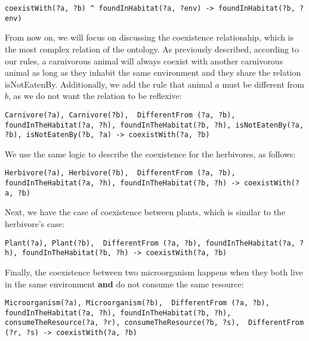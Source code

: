 \begin{lstlisting}
coexistWith(?a, ?b) ^ foundInHabitat(?a, ?env) -> foundInHabitat(?b, ?env)
\end{lstlisting}


From now on, we will focus on discussing the coexistence relationship, which is the most complex relation of the ontology. As previously described, according to our rules, a carnivorous animal will always coexist with another carnivorous animal as long as they inhabit the same environment and they share the relation isNotEatenBy. Additionally, we add the rule that animal $a$ must be different from $b$, as we do not want the relation to be reflexive:


\begin{lstlisting}
Carnivore(?a), Carnivore(?b),  DifferentFrom (?a, ?b), foundInTheHabitat(?a, ?h), foundInTheHabitat(?b, ?h), isNotEatenBy(?a, ?b), isNotEatenBy(?b, ?a) -> coexistWith(?a, ?b)
\end{lstlisting}

We use the same logic to describe the coexistence for the herbivores, as follows:
\\

\begin{lstlisting}
Herbivore(?a), Herbivore(?b),  DifferentFrom (?a, ?b), foundInTheHabitat(?a, ?h), foundInTheHabitat(?b, ?h) -> coexistWith(?a, ?b)
\end{lstlisting}

Next, we have the case of coexistence between plants, which is similar to the herbivore's case:
\\

\begin{lstlisting}
Plant(?a), Plant(?b),  DifferentFrom (?a, ?b), foundInTheHabitat(?a, ?h), foundInTheHabitat(?b, ?h) -> coexistWith(?a, ?b)
\end{lstlisting}

Finally, the coexistence between two microorganism happens when they both live in the same environment \textbf{and} do not consume the same resource: 
\\

\begin{lstlisting}
Microorganism(?a), Microorganism(?b),  DifferentFrom (?a, ?b), foundInTheHabitat(?a, ?h), foundInTheHabitat(?b, ?h), consumeTheResource(?a, ?r), consumeTheResource(?b, ?s),  DifferentFrom (?r, ?s) -> coexistWith(?a, ?b)
\end{lstlisting}